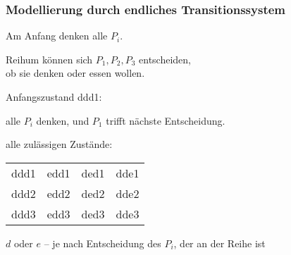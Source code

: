     \begin{frame}
      \frametitle{Modellierung durch endliches Transitionssystem}

      \begin{Itemize}
        \item
          Am Anfang denken  alle $P_i$.
          \par\smallskip
        \item
          Reihum können sich $P_1,P_2,P_3$ entscheiden,\\
          ob sie denken oder essen  wollen.
      \end{Itemize}

      \par\bigskip
      \begin{Itemize}
        \item
          Anfangszustand ddd1:
          \par%
          alle $P_i$ denken, und $P_1$ trifft nächste Entscheidung.
          \par\smallskip
        \item
          alle zulässigen Zustände:
          \begin{center}
            \begin{tabular}{@{}l@{~~~}l@{~~~}l@{~~~}l@{}}
              ddd1 & edd1 & ded1 & dde1 \\
              ddd2 & edd2 & ded2 & dde2 \\
              ddd3 & edd3 & ded3 & dde3
            \end{tabular}
          \end{center}

      \end{Itemize}

      \par\bigskip
      \begin{Itemize}
        \item[]
          $d$ oder $e$ -- je nach Entscheidung des $P_i$, der an der Reihe ist
      \end{Itemize}
    \end{frame}

